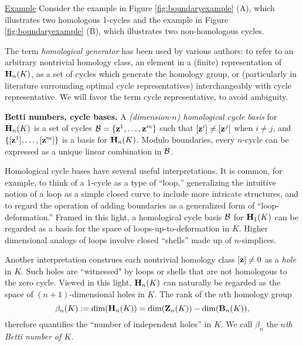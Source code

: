 \noindent \underline{Example} Consider the example in Figure \ref{fig:boundaryexample} (A), which illustrates two homologous 1-cycles and the example in Figure \ref{fig:boundaryexample} (B), which illustrates two non-homologous cycles. 


\begin{remark}
The term \emph{homological generator} has been used \DIFdelbegin {}\DIFdelend \DIFaddbegin {}\DIFaddend by various authors: to refer to an arbitrary nontrivial homology class, an element in a (finite) representation of $\mathbf{H}_n(K)$, as a set of cycles which generate the homology group, or (particularly in literature surrounding optimal cycle representatives)  interchangeably with cycle representative. We will  favor the term cycle representative, to avoid ambiguity.
\end{remark}




\noindent \textbf{Betti numbers, cycle bases.}  A \emph{(dimension-$n$) homological cycle basis} for $\mathbf{H}_n(K)$ is a set of cycles $\mathcal B = \{ {\mathbf z}^1 , \ldots, {\mathbf z}^m\}$ such that $[{\mathbf z}^i] \neq [{\mathbf z}^j]$ when $i \neq j$, and $\{ [{\mathbf z}^1] , \ldots, [{\mathbf z}^m]\}$ is a  basis for $\mathbf{H}_n(K)$.  Modulo boundaries, every $n$-cycle can be expressed as a unique linear combination in $\mathcal B$.  

Homological cycle bases have several useful interpretations.  It is common, for example, to think of a 1-cycle as a type of ``loop,'' generalizing the intuitive notion of a loop as a simple closed curve to include more intricate structures, and to regard the operation of adding boundaries as a generalized form of ``loop-deformation.''  Framed in this light, a homological cycle basis $\mathcal B$ for $\mathbf{H}_1(K)$ can be regarded as a basis for the space of loops-up-to-deformation in $K$. Higher dimensional analogs of loops involve closed ``shells'' made up of $n$-simplices.

Another interpretation construes each nontrivial homology class $[{\mathbf z}] \neq 0$ as a \emph{hole} in $K$. Such holes are ``witnessed" by loops or shells that are not homologous to the zero cycle. Viewed in this light, $\mathbf{H}_n(K)$ can naturally be regarded as the space of $(n+1)$-dimensional holes in $K$.  The rank of the $n$th homology group
    \[
    \beta_n(K) := \text{dim}(\mathbf{H}_n(K)) = \text{dim}(\mathbf{Z}_n(K)) - \text{dim}(\mathbf{B}_n(K)),
    \]
therefore quantifies the ``number of independent holes'' in $K$.  We call $\beta_n$ the \emph{$n$th Betti number of $K$}.  

